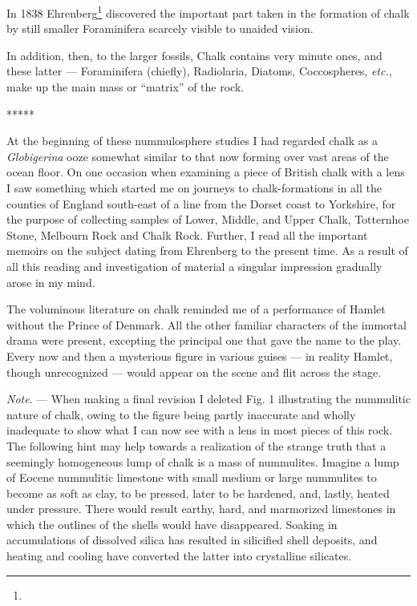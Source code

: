 \documentclass[a4paper, 12pt, oneside]{article}
\begin{document}
In 1838 Ehrenberg\footnote{} discovered the important part taken in the formation of chalk by still smaller Foraminifera scarcely visible to unaided vision.

In addition, then, to the larger fossils, Chalk contains very minute ones, and these latter --- Foraminifera (chiefly), Radiolaria, Diatoms, Coccospheres, \emph{etc.}, make up the main mass or ``matrix'' of the rock.

\centerline{*\hspace{15mm}*\hspace{15mm}*\hspace{15mm}*\hspace{15mm}*}
\bigskip

At the beginning of these nummulosphere studies I had regarded chalk as a \emph{Globigerina} ooze somewhat similar to that now forming over vast areas of the ocean floor. On one occasion when examining a piece of British chalk with a lens I saw something which started me on journeys to chalk-formations in all the counties of England south-east of a line from the Dorset coast to Yorkshire, for the purpose of collecting samples of Lower, Middle, and Upper Chalk, Totternhoe Stone, Melbourn Rock and Chalk Rock. Further, I read all the important memoirs on the subject dating from Ehrenberg to the present time. As a result of all this reading and investigation of material a singular impression gradually arose in my mind.

The voluminous literature on chalk reminded me of a performance of Hamlet without the Prince of Denmark. All the other familiar characters of the immortal drama were present, excepting the principal one that gave the name to the play. Every now and then a mysterious figure in various guises --- in reality Hamlet, though unrecognized --- would appear on the scene and flit across the stage.

\emph{Note}. --- When making a final revision I deleted Fig. 1 illustrating the nummulitic nature of chalk, owing to the figure being partly inaccurate and wholly inadequate to show what I can now see with a lens in most pieces of this rock. The following hint may help towards a realization of the strange truth that a seemingly homogeneous lump of chalk is a mass of nummulites. Imagine a lump of Eocene nummulitic limestone with small medium or large nummulites to become as soft as clay, to be pressed, later to be hardened, and, lastly, heated under pressure. There would result earthy, hard, and marmorized limestones in which the outlines of the shells would have disappeared. Soaking in accumulations of dissolved silica has resulted in silicified shell deposits, and heating and cooling have converted the latter into crystalline silicates.
\end{document}
